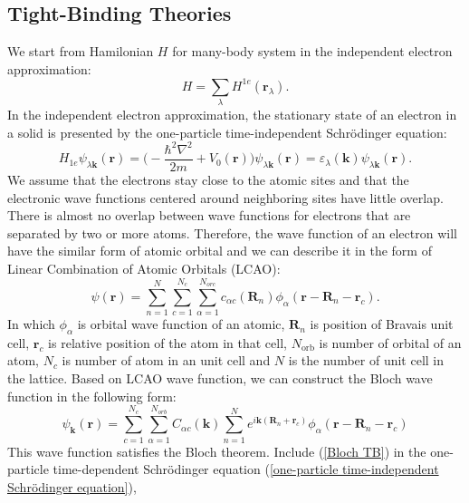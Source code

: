 \documentclass[12pt,english,a4paper]{article}
\begin{document}
	\subsection{Tight-Binding Theories}
	\quad We start from Hamilonian $H$ for many-body system in the independent electron approximation:
	\begin{equation}
		H =\sum_{\lambda} H^{1e} (\textbf{r}_\lambda).
	\end{equation}
	In the independent electron approximation, the stationary state of an electron in a solid is presented by the one-particle time-independent Schrödinger equation:
	\begin{equation}
		\label{one-particle time-independent Schrödinger equation}
		H_{1e} \psi_{\lambda\textbf{k}}( \textbf{r}) = \bigg(-\frac{\hbar^2 \nabla^2}{2m} + V_0 (\textbf{r})\bigg) \psi_{\lambda \textbf{k}}(\textbf{r}) = \varepsilon_{\lambda}(\textbf{k})\psi_{\lambda \textbf{k}}(\textbf{r}).
	\end{equation}
	\quad We assume that the electrons stay close to the atomic sites and that the electronic wave functions centered around neighboring sites have little overlap. There is almost no overlap between wave functions for electrons that are separated by two or more atoms. Therefore, the wave function of an electron will have the similar form of atomic orbital and we can describe it in the form of Linear Combination of Atomic Orbitals (LCAO):
	\begin{equation}
		\psi(\textbf{r}) = \sum_{n=1}^N \sum_{c=1}^{N_c}\sum_{\alpha = 1}^{N_{orc}}c_{\alpha c}(\textbf{R}_n) \phi_\alpha(\textbf{r} -\textbf{R}_n- \textbf{r}_c).
	\end{equation}
	In which $\phi_\alpha$ is orbital wave function of an atomic, $\textbf{R}_n$ is position of Bravais unit cell, $\textbf{r}_c$ is relative position of the atom in that cell, $N_{\mathrm{orb}}$ is number of orbital of an atom, $N_c$ is number of atom in an unit cell and $N$ is the number of unit cell in the lattice. Based on LCAO wave function, we can construct the Bloch wave function in the following form:
	\begin{equation}
		\label{Bloch TB}
		\psi_{\textbf{k}} (\textbf{r}) = \sum_{c=1}^{N_c} \sum_{\alpha = 1}^{N_{orb}} C_{\alpha c} (\textbf{k}) \sum_{n=1}^N e^{i\textbf{k}(\textbf{R}_n +\textbf{r}_c)} \phi_{\alpha}(\textbf{r} -\textbf{R}_n -\textbf{r}_c)
	\end{equation}
	\quad This wave function satisfies the Bloch theorem. Include (\ref{Bloch TB}) in the one-particle time-dependent Schrödinger equation (\ref{one-particle time-independent Schrödinger equation}),
\end{document}
